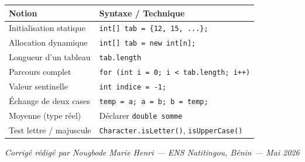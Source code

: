 \documentclass[12pt,a4paper]{article}
\begin{document}
	\begin{center}
		\begin{tabular}{|l|l|}
			\hline
			\textbf{Notion} & \textbf{Syntaxe / Technique} \\
			\hline
			Initialisation statique  & \texttt{int[] tab = \{12, 15, ...\};} \\
			Allocation dynamique     & \texttt{int[] tab = new int[n];} \\
			Longueur d'un tableau    & \texttt{tab.length} \\
			Parcours complet         & \texttt{for (int i = 0; i < tab.length; i++)} \\
			Valeur sentinelle        & \texttt{int indice = -1;} \\
			Échange de deux cases    & \texttt{temp = a; a = b; b = temp;} \\
			Moyenne (type réel)      & Déclarer \texttt{double somme} \\
			Test lettre / majuscule  & \texttt{Character.isLetter()}, \texttt{isUpperCase()} \\
			\hline
		\end{tabular}
	\end{center}
	
	\vfill
	\begin{center}
		\textit{Corrigé rédigé par Nougbode Marie Henri — ENS Natitingou, Bénin — Mai 2026}
	\end{center}
	
\end{document}
